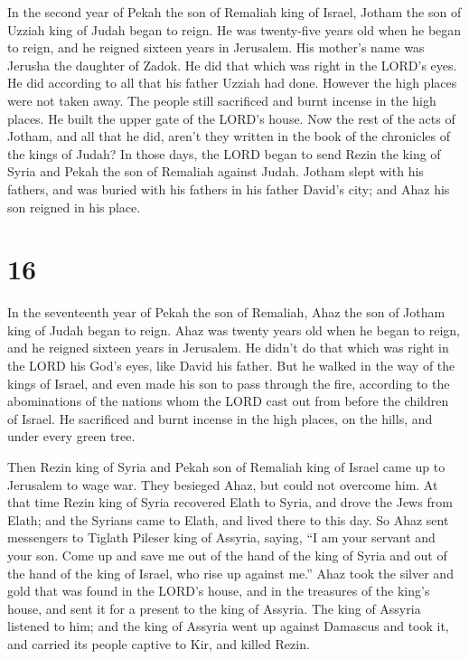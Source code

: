  In the second year of Pekah the son of Remaliah king of
Israel, Jotham the son of Uzziah king of Judah began to reign.
 He was twenty-five years old when he began to reign, and
he reigned sixteen years in Jerusalem. His mother's name was Jerusha the
daughter of Zadok.  He did that which was right in the
LORD's eyes. He did according to all that his father Uzziah had done.
 However the high places were not taken away. The people
still sacrificed and burnt incense in the high places. He built the
upper gate of the LORD's house.  Now the rest of the acts
of Jotham, and all that he did, aren't they written in the book of the
chronicles of the kings of Judah?  In those days, the LORD
began to send Rezin the king of Syria and Pekah the son of Remaliah
against Judah.  Jotham slept with his fathers, and was
buried with his fathers in his father David's city; and Ahaz his son
reigned in his place.

\hypertarget{section-15}{%
\section{16}\label{section-15}}

 In the seventeenth year of Pekah the son of Remaliah, Ahaz
the son of Jotham king of Judah began to reign.  Ahaz was
twenty years old when he began to reign, and he reigned sixteen years in
Jerusalem. He didn't do that which was right in the LORD his God's eyes,
like David his father.  But he walked in the way of the
kings of Israel, and even made his son to pass through the fire,
according to the abominations of the nations whom the LORD cast out from
before the children of Israel.  He sacrificed and burnt
incense in the high places, on the hills, and under every green tree.

 Then Rezin king of Syria and Pekah son of Remaliah king of
Israel came up to Jerusalem to wage war. They besieged Ahaz, but could
not overcome him.  At that time Rezin king of Syria
recovered Elath to Syria, and drove the Jews from Elath; and the Syrians
came to Elath, and lived there to this day.  So Ahaz sent
messengers to Tiglath Pileser king of Assyria, saying, ``I am your
servant and your son. Come up and save me out of the hand of the king of
Syria and out of the hand of the king of Israel, who rise up against
me.''  Ahaz took the silver and gold that was found in the
LORD's house, and in the treasures of the king's house, and sent it for
a present to the king of Assyria.  The king of Assyria
listened to him; and the king of Assyria went up against Damascus and
took it, and carried its people captive to Kir, and killed Rezin.

